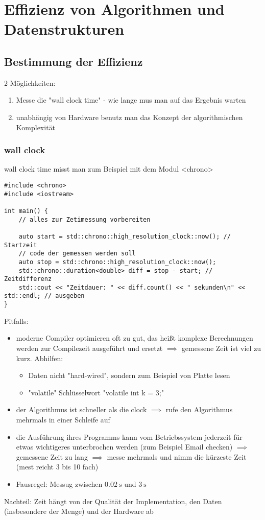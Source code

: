 \documentclass[a4paper]{scrartcl}
\theoremstyle{definition}
\theoremstyle{plain}
\theoremstyle{remark}
\theoremstyle{remark}
\begin{document}
\section{Effizienz von Algorithmen und Datenstrukturen}
\label{sec-15}
\subsection{Bestimmung der Effizienz}
\label{sec-15-1}
2 Möglichkeiten:
\begin{enumerate}
\item Messe die "wall clock time" - wie lange mus man auf das Ergebnis warten
\item unabhängig von Hardware benutz man das Konzept der algorithmischen Komplexität
\end{enumerate}
\subsubsection{wall clock}
\label{sec-15-1-1}
wall clock time misst man zum Beispiel mit dem Modul <chrono>
\begin{verbatim}
#include <chrono>
#include <iostream>

int main() {
	// alles zur Zetimessung vorbereiten

	auto start = std::chrono::high_resolution_clock::now(); // Startzeit
	// code der gemessen werden soll
	auto stop = std::chrono::high_resolution_clock::now();
	std::chrono::duration<double> diff = stop - start; // Zeitdifferenz
	std::cout << "Zeitdauer: " << diff.count() << " sekunden\n" << std::endl; // ausgeben
}
\end{verbatim}
Pitfalls:
\begin{itemize}
\item moderne Compiler optimieren oft zu gut, das heißt komplexe Berechnungen werden zur Compilezeit ausgeführt und ersetzt $\implies$ gemessene Zeit ist viel zu kurz.
Abhilfen:
\begin{itemize}
\item Daten nicht "hard-wired", sondern zum Beispiel von Platte lesen
\item "volatile" Schlüsselwort "volatile int k = 3;"
\end{itemize}
\item der Algorithmus ist schneller als die clock $\implies$ rufe den Algorithmus mehrmals in einer Schleife
auf
\item die Ausführung ihres Programms kann vom Betriebssystem jederzeit für etwas wichtigeres unterbrochen werden
(zum Beispiel Email checken) $\implies$ gemessene Zeit zu lang $\implies$ messe
mehrmals und nimm die kürzeste Zeit (mest reicht 3 bis 10 fach)
\item Fausregel: Messug zwischen $\SI{0.02}{\second}$ und $\SI{3}{\second}$
\end{itemize}
Nachteil: Zeit hängt von der Qualität der Implementation, den Daten (insbesondere der Menge) und der Hardware ab
\end{document}
